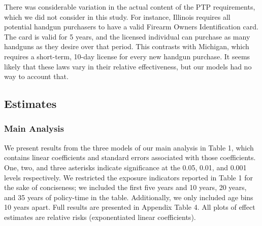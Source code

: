 \documentclass[]{article}
\begin{document}
There was considerable variation in the actual content of the PTP
requirements, which we did not consider in this study. For instance,
Illinois requires all potential handgun purchasers to have a valid
Firearm Owners Identification card. The card is valid for 5 years, and
the licensed individual can purchase as many handguns as they desire
over that period. This contrasts with Michigan, which requires a
short-term, 10-day license for every new handgun purchase. It seems
likely that these laws vary in their relative effectiveness, but our
models had no way to account that.

\subsection{Estimates}\label{estimates}

\subsubsection{Main Analysis}\label{main-analysis}

We present results from the three models of our main analysis in Table
1, which contains linear coefficients and standard errors associated
with those coefficients. One, two, and three asterisks indicate
significance at the 0.05, 0.01, and 0.001 levels respectively. We
restricted the exposure indicators reported in Table 1 for the sake of
conciseness; we included the first five years and 10 years, 20 years,
and 35 years of policy-time in the table. Additionally, we only included
age bins 10 years apart. Full results are presented in Appendix Table 4.
All plots of effect estimates are relative risks (exponentiated linear
coefficients).
\end{document}
